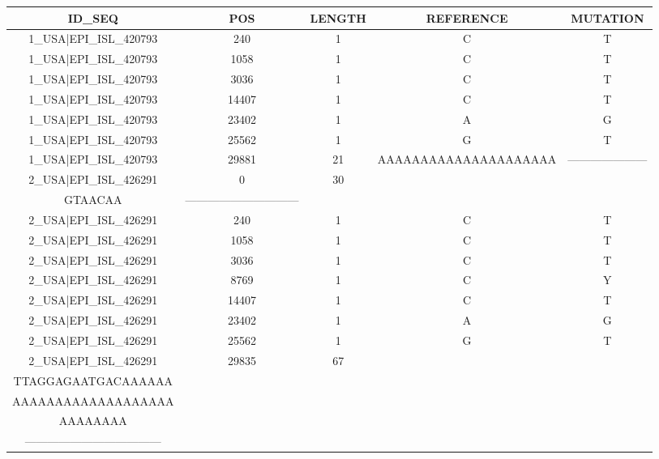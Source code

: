 \documentclass[a4paper,10pt]{article}
\begin{document}
\begin{longtable}{@{}ccccc@{}}
\toprule
\textbf{ID\_SEQ} & \textbf{POS} & \textbf{LENGTH} & \textbf{REFERENCE} & \textbf{MUTATION} \\* \midrule
\endfirsthead
%
\cline{1-5}
\endhead
%
1\_USA|EPI\_ISL\_420793 & 240 & 1 & C & T \\* \midrule
1\_USA|EPI\_ISL\_420793 & 1058 & 1 & C & T \\* \midrule
1\_USA|EPI\_ISL\_420793 & 3036 & 1 & C & T \\* \midrule
1\_USA|EPI\_ISL\_420793 & 14407 & 1 & C & T \\* \midrule
1\_USA|EPI\_ISL\_420793 & 23402 & 1 & A & G \\* \midrule
1\_USA|EPI\_ISL\_420793 & 25562 & 1 & G & T \\* \midrule
1\_USA|EPI\_ISL\_420793 & 29881 & 21 & AAAAAAAAAAAAAAAAAAAAA & --------------------- \\* \midrule
2\_USA|EPI\_ISL\_426291 & 0 & 30 & \begin{tabular}[c]{@{}c@{}}ATTAAAGGTTTATACCTTCCCAG\\ GTAACAA\end{tabular} & ------------------------------ \\* \midrule
2\_USA|EPI\_ISL\_426291 & 240 & 1 & C & T \\* \midrule
2\_USA|EPI\_ISL\_426291 & 1058 & 1 & C & T \\* \midrule
2\_USA|EPI\_ISL\_426291 & 3036 & 1 & C & T \\* \midrule
2\_USA|EPI\_ISL\_426291 & 8769 & 1 & C & Y \\* \midrule
2\_USA|EPI\_ISL\_426291 & 14407 & 1 & C & T \\* \midrule
2\_USA|EPI\_ISL\_426291 & 23402 & 1 & A & G \\* \midrule
2\_USA|EPI\_ISL\_426291 & 25562 & 1 & G & T \\* \midrule
2\_USA|EPI\_ISL\_426291 & 29835 & 67 & \begin{tabular}[c]{@{}c@{}}CCATGTGATTTTAATAGCTTC\\ TTAGGAGAATGACAAAAAA\\ AAAAAAAAAAAAAAAAAAA\\ AAAAAAAA\end{tabular} & \begin{tabular}[c]{@{}c@{}}-------------------------------\\ ------------------------------------\end{tabular} \\* \midrule

\end{longtable}
\end{document}
